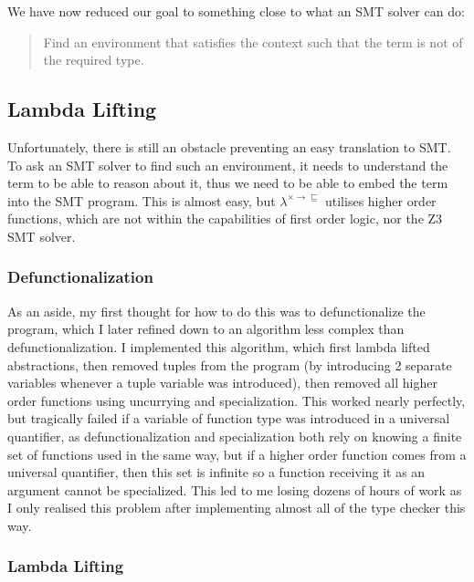 We have now reduced our goal to something close to what an SMT solver can do:

\begin{quote}
    Find an environment that satisfies the context such that the term is not of the required type.
\end{quote}

\subsection{Lambda Lifting}

Unfortunately, there is still an obstacle preventing an easy translation to SMT.
To ask an SMT solver to find such an environment, it needs to understand the term to be able to reason
about it, thus we need to be able to embed the term into the SMT program.
This is almost easy, but $\lambda^{\times \rightarrow \sqsubseteq}$ utilises higher order functions,
which are not within the capabilities of first order logic, nor the Z3 SMT solver.

\subsubsection{Defunctionalization}

As an aside, my first thought for how to do this was to defunctionalize the program, which I later
refined down to an algorithm less complex than defunctionalization.
I implemented this algorithm, which first lambda lifted abstractions, then removed tuples from the
program (by introducing 2 separate variables whenever a tuple variable was introduced), then removed
all higher order functions using uncurrying and specialization.
This worked nearly perfectly, but tragically failed if a variable of function type was introduced
in a universal quantifier, as defunctionalization and specialization both rely on knowing a finite
set of functions used in the same way, but if a higher order function comes from a universal
quantifier, then this set is infinite so a function receiving it as an argument cannot be specialized.
This led to me losing dozens of hours of work as I only realised this problem after implementing
almost all of the type checker this way.

\subsubsection{Lambda Lifting}

